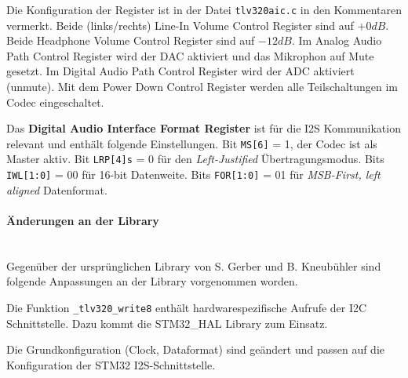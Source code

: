 Die Konfiguration der Register ist in der Datei \texttt{tlv320aic.c} in den Kommentaren vermerkt. Beide (links/rechts) Line-In Volume Control Register sind auf $+0\si{dB}$.
Beide Headphone Volume Control Register sind auf $-12\si{dB}$.
Im Analog Audio Path Control Register wird der DAC aktiviert und das Mikrophon auf Mute gesetzt.
Im Digital Audio Path Control Register wird der ADC aktiviert (unmute).
Mit dem Power Down Control Register werden alle Teilschaltungen im Codec eingeschaltet.

Das \textbf{Digital Audio Interface Format Register} ist für die I2S Kommunikation relevant und enthält folgende Einstellungen. Bit \texttt{MS[6]} = 1, der Codec ist als Master aktiv. Bit \texttt{LRP[4]s} = 0 für den \textit{Left-Justified} Übertragungsmodus.
Bits \texttt{IWL[1:0]} = 00 für 16-bit Datenweite.
Bits \texttt{FOR[1:0]} = 01 für \textit{MSB-First, left aligned} Datenformat.
\\
\paragraph{Änderungen an der Library}\vspace{-0.3cm}\\
Gegenüber der ursprünglichen Library von S. Gerber und B. Kneubühler sind folgende Anpassungen an der Library vorgenommen worden.

Die Funktion \texttt{\_tlv320\_write8} enthält hardwarespezifische Aufrufe der I2C Schnittstelle. Dazu kommt die STM32\_HAL Library zum Einsatz.

Die Grundkonfiguration (Clock, Dataformat) sind geändert und passen auf die Konfiguration der STM32 I2S-Schnittstelle.


